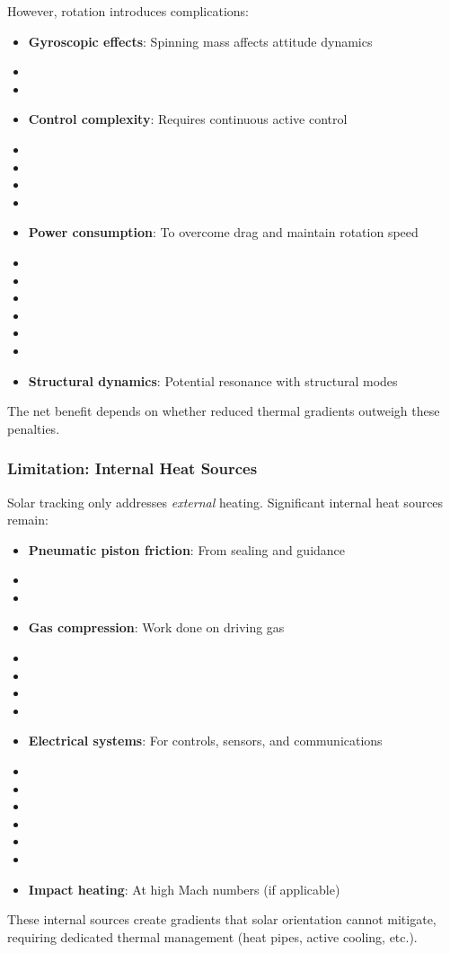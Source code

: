 {{{{However, rotation introduces complications:
\begin{itemize}
    \item \textbf{Gyroscopic effects}: Spinning mass affects attitude dynamics
    \item \item \item \textbf{Control complexity}: Requires continuous active control
    \item \item \item \item \item \textbf{Power consumption}: To overcome drag and maintain rotation speed
    \item \item \item \item \item \item \item \textbf{Structural dynamics}: Potential resonance with structural modes
\end{itemize}
The net benefit depends on whether reduced thermal gradients outweigh these penalties.

\subsubsection{Limitation: Internal Heat Sources}
Solar tracking only addresses \emph{external} heating. Significant internal heat sources remain:
\begin{itemize}
    \item \textbf{Pneumatic piston friction}: From sealing and guidance
    \item \item \item \textbf{Gas compression}: Work done on driving gas
    \item \item \item \item \item \textbf{Electrical systems}: For controls, sensors, and communications
    \item \item \item \item \item \item \item \textbf{Impact heating}: At high Mach numbers (if applicable)
\end{itemize}
These internal sources create gradients that solar orientation cannot mitigate, requiring dedicated thermal management (heat pipes, active cooling, etc.).

}}}}
